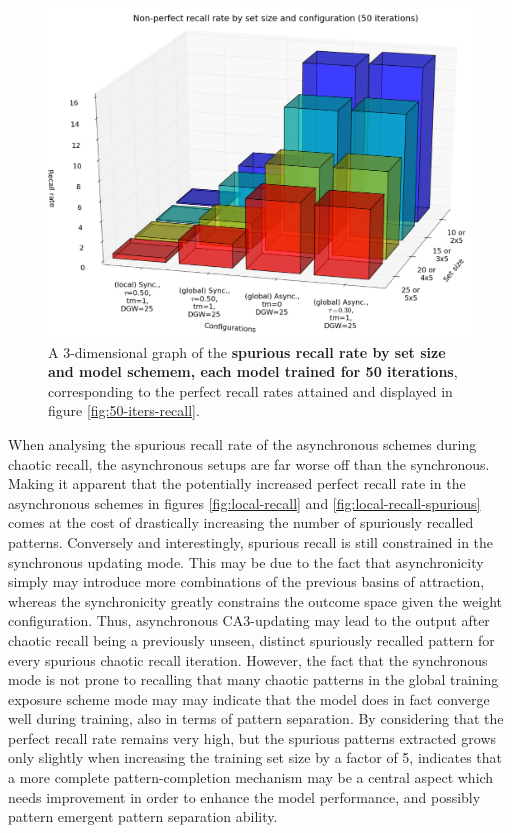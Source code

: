\begin{figure}
    \centering
    \includegraphics[width=13cm]{fig/i-iters/50-iters-recall-spurious}
    \caption{A 3-dimensional graph of the \textbf{spurious recall rate by set size and model schemem, each model trained for 50 iterations}, corresponding to the perfect recall rates attained and displayed in figure \ref{fig:50-iters-recall}.}
    \label{fig:50-iters-recall-spurious}
\end{figure}

When analysing the spurious recall rate of the asynchronous schemes during chaotic recall, the asynchronous setups are far worse off than the synchronous. Making it apparent that the potentially increased perfect recall rate in the asynchronous schemes in figures \ref{fig:local-recall} and \ref{fig:local-recall-spurious} comes at the cost of drastically increasing the number of spuriously recalled patterns. Conversely and interestingly, spurious recall is still constrained in the synchronous updating mode. This may be due to the fact that asynchronicity simply may introduce more combinations of the previous basins of attraction, whereas the synchronicity greatly constrains the outcome space given the weight configuration. Thus, asynchronous CA3-updating may lead to the output after chaotic recall being a previously unseen, distinct spuriously recalled pattern for every spurious chaotic recall iteration. However, the fact that the synchronous mode is not prone to recalling that many chaotic patterns in the global training exposure scheme mode may may indicate that the model does in fact converge well during training, also in terms of pattern separation. By considering that the perfect recall rate remains very high, but the spurious patterns extracted grows only slightly when increasing the training set size by a factor of 5, indicates that a more complete pattern-completion mechanism may be a central aspect which needs improvement in order to enhance the model performance, and possibly pattern emergent pattern separation ability.

